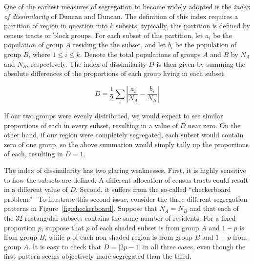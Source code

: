 \documentclass{article}
\theoremstyle{theorem}
\theoremstyle{definition}
\begin{document}
One of the earliest measures of segregation to become widely adopted is the \textit{index of dissimilarity} of Duncan and Duncan. \cite{duncan55} The definition of this index requires a partition of region in question into $k$ subsets; typically, this partition is defined by census tracts or block groups. For each subset of this partition, let $a_i$ be the population of group $A$ residing the the subset, and let $b_i$ be the population of group $B$, where $1 \leq i \leq k$. Denote the total populations of groups $A$ and $B$ by $N_A$ and $N_B$, respectively. The index of dissimilarity $D$ is then given by summing the absolute differences of the proportions of each group living in each subset.

\begin{equation}
  D = \frac{1}{2} \sum_i \left\lvert \frac{a_i}{N_A} - \frac{b_i}{N_B} \right\rvert
\end{equation}

If our two groups were evenly distributed, we would expect to see similar proportions of each in every subset, resulting in a value of $D$ near zero. On the other hand, if our region were completely segregated, each subset would contain zero of one group, so the above summation would simply tally up the proportions of each, resulting in $D = 1$.

The index of dissimilarity has two glaring weaknesses. First, it is highly sensitive to how the subsets are defined. A different allocation of census tracts could result in a different value of $D$. Second, it suffers from the so-called ``checkerboard problem.''~\cite{morrill91} To illustrate this second issue, consider the three different segregation patterns in Figure~\ref{fig:checkerboard}. Suppose that $N_A = N_B$ and that each of the 32 rectangular subsets contains the same number of residents. For a fixed proportion $p$, suppose that $p$ of each shaded subset is from group $A$ and $1-p$ is from group $B$, while $p$ of each non-shaded region is from group $B$ and $1-p$ from group $A$. It is easy to check that $D = \lvert 2p-1 \rvert$ in all three cases, even though the first pattern seems objectively more segregated than the third.
\end{document}
